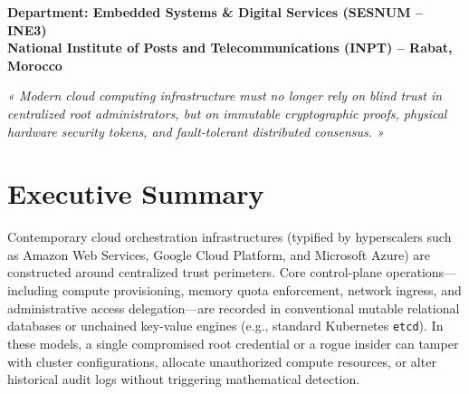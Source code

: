 \documentclass[a4paper,12pt]{article}
\begin{document}
\begin{titlepage}
\vspace{0.35cm}

\begin{tcolorbox}[colframe=primary, colback=primary!10, sharp corners=northwest, width=0.90\textwidth, boxrule=0.8mm, top=0.25cm, bottom=0.25cm]
\centering
\textbf{\normalsize Department: Embedded Systems \& Digital Services (SESNUM -- INE3)}\\[0.1cm]
{\normalsize \textbf{National Institute of Posts and Telecommunications (INPT) -- Rabat, Morocco}}
\end{tcolorbox}

\vfill

{\small \textit{« Modern cloud computing infrastructure must no longer rely on blind trust in centralized root administrators, but on immutable cryptographic proofs, physical hardware security tokens, and fault-tolerant distributed consensus. »}}\\[0.35cm]

\begin{tcolorbox}[colframe=primary, colback=primary, width=\textwidth, boxrule=0mm, sharp corners, height=0.35cm]
\end{tcolorbox}

\end{titlepage}

\newpage
{}
\tableofcontents
\newpage
\listoffigures
\listoftables
\newpage
{}

\section*{Executive Summary}

Contemporary cloud orchestration infrastructures (typified by hyperscalers such as Amazon Web Services, Google Cloud Platform, and Microsoft Azure) are constructed around centralized trust perimeters. Core control-plane operations—including compute provisioning, memory quota enforcement, network ingress, and administrative access delegation—are recorded in conventional mutable relational databases or unchained key-value engines (e.g., standard Kubernetes \texttt{etcd}). In these models, a single compromised root credential or a rogue insider can tamper with cluster configurations, allocate unauthorized compute resources, or alter historical audit logs without triggering mathematical detection.
\end{document}
